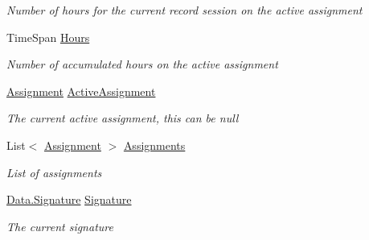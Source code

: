 \begin{DoxyCompactItemize}
\begin{DoxyCompactList}\small\item\em Number of hours for the current record session on the active assignment \end{DoxyCompactList}\item 
Time\+Span \hyperlink{class_field_service_1_1_view_models_1_1_assignment_view_model_a8c4cf62fb86d4dd82675479cd5735ed3}{Hours}
\begin{DoxyCompactList}\small\item\em Number of accumulated hours on the active assignment \end{DoxyCompactList}\item 
\hyperlink{class_field_service_1_1_data_1_1_assignment}{Assignment} \hyperlink{class_field_service_1_1_view_models_1_1_assignment_view_model_a22d0c91898b0b8b2813c3d842df0c2b3}{Active\+Assignment}
\begin{DoxyCompactList}\small\item\em The current active assignment, this can be null \end{DoxyCompactList}\item 
List$<$ \hyperlink{class_field_service_1_1_data_1_1_assignment}{Assignment} $>$ \hyperlink{class_field_service_1_1_view_models_1_1_assignment_view_model_afdc84c2b2c77fd5dd1c7d27b8fb7f5fd}{Assignments}
\begin{DoxyCompactList}\small\item\em List of assignments \end{DoxyCompactList}\item 
\hyperlink{class_field_service_1_1_data_1_1_signature}{Data.\+Signature} \hyperlink{class_field_service_1_1_view_models_1_1_assignment_view_model_ad24077c9d1898c16468350c01b4fe5f5}{Signature}
\begin{DoxyCompactList}\small\item\em The current signature \end{DoxyCompactList}\end{DoxyCompactItemize}
